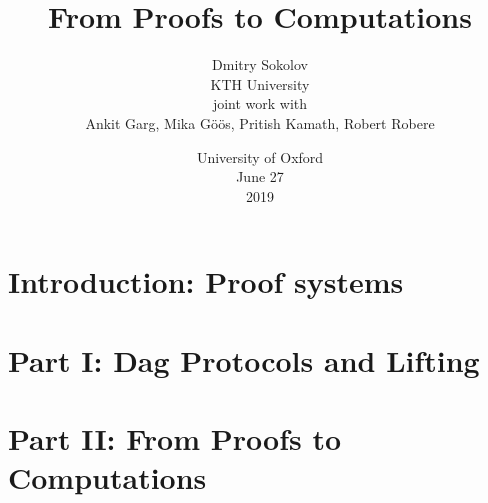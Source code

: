 \documentclass[english, xcolor = {table}]{beamer}
\title[Proofs and Computations]{
    From Proofs to Computations
}
\author[Sokolov D.]{
    Dmitry Sokolov\\
    KTH University\\
    \vspace{1cm}
    joint work with\\
    Ankit Garg, Mika G{\"{o}}{\"{o}}s, Pritish Kamath, Robert Robere
}
\date{University of Oxford\\
	June 27\\
	2019
}
\begin{document}
    \maketitle

    \section{Introduction: Proof systems}

    

    \section{Part I: Dag Protocols and Lifting}

    
    
    
    

    \section{Part II: From Proofs to Computations}

    
    
    
\end{document}
